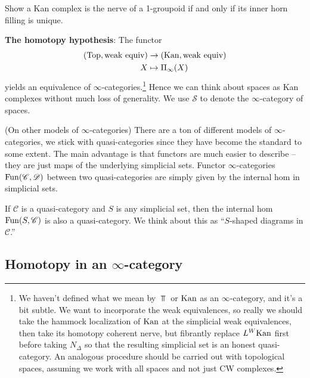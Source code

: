 \documentclass[11pt]{amsart}
\begin{document}
\begin{exercise} Show a Kan complex is the nerve of a 1-groupoid if and only if its inner horn filling is unique.
\end{exercise}

\textbf{The homotopy hypothesis}: The functor
\begin{align*}
    (\mathrm{Top},\text{weak equiv}) &\to (\mathrm{Kan}, \text{weak equiv}) \\
    X &\mapsto \Pi_\infty(X)
\end{align*}
yields an equivalence of $\infty$-categories.\footnote{%
We haven't defined what we mean by $\Top$ or $\mathrm{Kan}$ as an $\infty$-category, and it's a bit subtle. We want to incorporate the weak equivalences, so really we should take the hammock localization of $\mathrm{Kan}$ at the simplicial weak equivalences, then take its homotopy coherent nerve, but fibrantly replace $L^W\mathrm{Kan}$ first before taking $N_\Delta$ so that the resulting simplicial set is an honest quasi-category. An analogous procedure should be carried out with topological spaces, assuming we work with all spaces and not just CW complexes.
}
Hence we can think about spaces as Kan complexes without much loss of generality. We use $\mathcal{S}$ to denote the $\infty$-category of spaces.

\begin{remark} (On other models of $\infty$-categories) There are a ton of different models of $\infty$-categories, we stick with quasi-categories since they have become the standard to some extent. The main advantage is that functors are much easier to describe -- they are just maps of the underlying simplicial sets. Functor $\infty$-categories $\mathrm{Fun}(\mathscr{C},\mathscr{D})$ between two quasi-categories are simply given by the internal hom in simplicial sets.
\end{remark}

\begin{proposition} If $\mathscr{C}$ is a quasi-category and $S$ is any simplicial set, then the internal hom $\mathrm{Fun}(S,\mathscr{C})$ is also a quasi-category. We think about this as ``$S$-shaped diagrams in $\mathscr{C}$.''
\end{proposition}



\subsection{Homotopy in an $\infty$-category}
\end{document}

